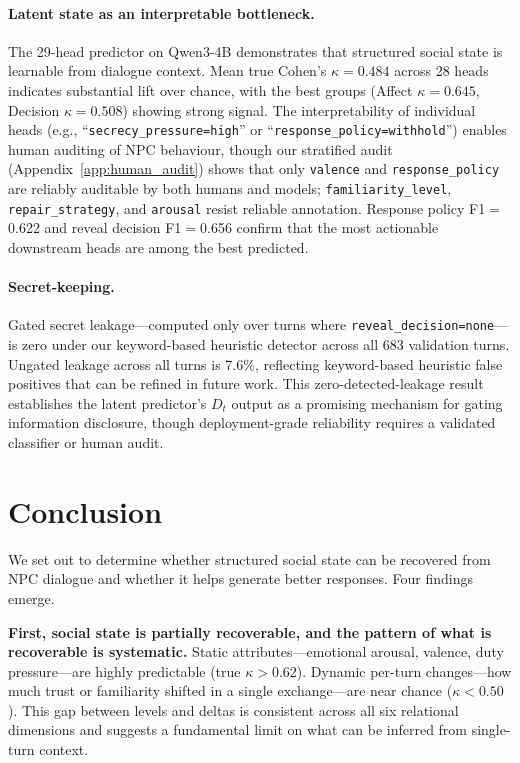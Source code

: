 \documentclass[11pt]{article}
\begin{document}
\paragraph{Latent state as an interpretable bottleneck.}
The 29-head predictor on Qwen3-4B demonstrates that structured social state is learnable from dialogue context.
Mean true Cohen's $\kappa=0.484$ across 28 heads indicates substantial lift over chance, with the best groups (Affect $\kappa=0.645$, Decision $\kappa=0.508$) showing strong signal.
The interpretability of individual heads (e.g., ``\texttt{secrecy\_pressure=high}'' or ``\texttt{response\_policy=withhold}'') enables human auditing of NPC behaviour, though our stratified audit (Appendix~\ref{app:human_audit}) shows that only \texttt{valence} and \texttt{response\_policy} are reliably auditable by both humans and models; \texttt{familiarity\_level}, \texttt{repair\_strategy}, and \texttt{arousal} resist reliable annotation.
Response policy F1$=$0.622 and reveal decision F1$=$0.656 confirm that the most actionable downstream heads are among the best predicted.

\paragraph{Secret-keeping.}
Gated secret leakage---computed only over turns where \texttt{reveal\_decision=none}---is zero under our keyword-based heuristic detector across all 683 validation turns.
Ungated leakage across all turns is 7.6\%, reflecting keyword-based heuristic false positives that can be refined in future work.
This zero-detected-leakage result establishes the latent predictor's $D_t$ output as a promising mechanism for gating information disclosure, though deployment-grade reliability requires a validated classifier or human audit.

\section{Conclusion}
\label{sec:conclusion}

We set out to determine whether structured social state can be recovered from NPC dialogue and whether it helps generate better responses.
Four findings emerge.

\textbf{First, social state is partially recoverable, and the pattern of what is recoverable is systematic.}
Static attributes---emotional arousal, valence, duty pressure---are highly predictable (true $\kappa{>}0.62$).
Dynamic per-turn changes---how much trust or familiarity shifted in a single exchange---are near chance ($\kappa{<}0.50$).
This gap between levels and deltas is consistent across all six relational dimensions and suggests a fundamental limit on what can be inferred from single-turn context.
\end{document}
